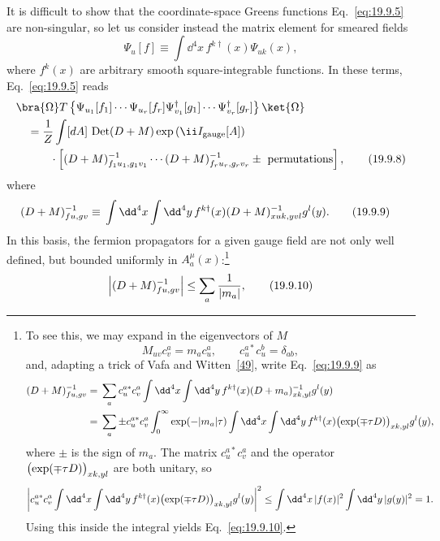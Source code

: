 It is difficult to show that the coordinate-space Greens functions Eq.~\eqref{eq:19.9.5} are non-singular, so let us consider instead the matrix element for smeared fields
\begin{equation}
\Psi_u[f]\equiv\int \dd^4x\,f^{k\dagger}(x)\Psi_{uk}(x),
\tag{19.9.7}\label{eq:19.9.7}
\end{equation}
where $f^k(x)$ are arbitrary smooth square-integrable functions. In these terms, Eq.~\eqref{eq:19.9.5} reads
\begin{align}
&\bra{\Omega}T\left\{
\Psi_{u_1}[f_1]\cdots\Psi_{u_r}[f_r]
\Psi^\dagger_{v_1}[g_1]\cdots\Psi^\dagger_{v_r}[g_r]
\right\}\ket{\Omega}
\notag\\
&\quad=\frac{1}{Z}\int[dA]\,
\operatorname{Det}(\sl{D}+M)
\exp\left(\ii I_{\mathrm{gauge}}[A]\right)
\notag\\
&\qquad\quad{}\cdot
\left[
(\sl{D}+M)^{-1}_{f_1u_1,g_1v_1}
\cdots
(\sl{D}+M)^{-1}_{f_ru_r,g_rv_r}
\mathbin{\pm}\text{ permutations}
\right],
\tag{19.9.8}\label{eq:19.9.8}
\end{align}
where
\begin{align}
(\sl{D}+M)^{-1}_{fu,gv}
\equiv{}&
\int \dd^4x\int \dd^4y\,
f^{k\dagger}(x)
(\sl{D}+M)^{-1}_{xuk,yvl}
g^l(y).
\tag{19.9.9}\label{eq:19.9.9}
\end{align}
In this basis, the fermion propagators for a given gauge field are not only well defined, but bounded uniformly in $A^\mu_a(x)$:\footnote{To see this, we may expand in the eigenvectors of $M$
\[
M_{uv}c_v^a=m_ac_u^a,
\qquad
c_u^{a*}c_u^b=\delta_{ab},
\]
and, adapting a trick of Vafa and Witten~\hyperref[ch19-ref-49]{[49]}, write Eq.~\eqref{eq:19.9.9} as
\begin{align*}
(\sl{D}+M)^{-1}_{fu,gv}
={}&\sum_a c_u^{a*}c_v^a
\int \dd^4x\int \dd^4y\,
f^{k\dagger}(x)
(\sl{D}+m_a)^{-1}_{xk,yl}g^l(y)
\\
={}&\sum_a\mathbin{\pm}c_u^{a*}c_v^a
\int_0^\infty\exp(-|m_a|\tau)
\int \dd^4x\int \dd^4y\,
f^{k\dagger}(x)
\bigl(\exp(\mp\tau\sl{D})\bigr)_{xk,yl}
g^l(y),
\end{align*}
where $\pm$ is the sign of $m_a$. The matrix $c_u^{a*}c_v^a$ and the operator $\bigl(\exp(\mp\tau\sl{D})\bigr)_{xk,yl}$ are both unitary, so
\[
\left|
c_u^{a*}c_v^a
\int \dd^4x\int \dd^4y\,
f^{k\dagger}(x)
\bigl(\exp(\mp\tau\sl{D})\bigr)_{xk,yl}
g^l(y)
\right|^2
\leq
\int \dd^4x\,|f(x)|^2
\int \dd^4y\,|g(y)|^2
=1.
\]
Using this inside the integral yields Eq.~\eqref{eq:19.9.10}.}
\begin{equation}
\left|(\sl{D}+M)^{-1}_{fu,gv}\right|
\leq\sum_a\frac{1}{|m_a|},
\tag{19.9.10}\label{eq:19.9.10}
\end{equation}
